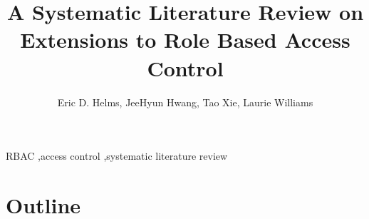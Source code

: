 \documentclass[3p,12pt]{elsarticle}
\begin{document}
\begin{frontmatter}

\title{A Systematic Literature Review on Extensions to Role Based Access Control}

\author{Eric D. Helms, JeeHyun Hwang, Tao Xie, Laurie Williams}
\address{North Carolina State University}
\address{Department of Computer Science}
\address{890 Oval Drive, Box 8206}
\address{Raleigh, NC 27695-2858}




\begin{keyword}
RBAC \sep access control \sep systematic literature review
\end{keyword}

\end{frontmatter}












\section{Outline}
\end{document}

